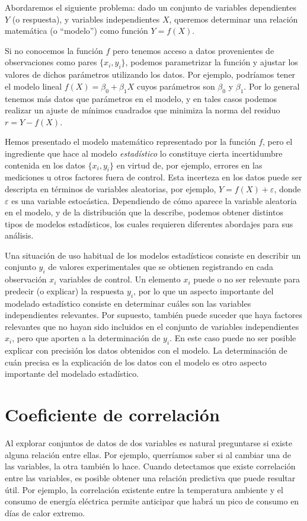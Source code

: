Abordaremos el siguiente problema: dado un conjunto de variables dependientes $Y$ (o respuesta), y variables independientes $X$, queremos determinar una relación matemática (o ``modelo'') como función $Y = f(X)$.

Si no conocemos la función $f$ pero tenemos acceso a datos provenientes de observaciones como pares $\{x_i, y_i\}$, podemos parametrizar la función y ajustar los valores de dichos parámetros utilizando los datos. Por ejemplo, podríamos tener el modelo lineal $f(X) = \beta_0 + \beta_1 X$ cuyos parámetros son $\beta_0$ y $\beta_1$. Por lo general tenemos más datos que parámetros en el modelo, y en tales casos podemos realizar un ajuste de mínimos cuadrados que minimiza la norma del residuo $r = Y - f(X)$.

Hemos presentado el modelo matemático representado por la función $f$, pero el ingrediente que hace al modelo \textit{estadístico} lo constituye cierta incertidumbre contenida en los datos $\{x_i, y_i\}$ en virtud de, por ejemplo, errores en las mediciones u otros factores fuera de control. Esta incerteza en los datos puede ser descripta en términos de variables aleatorias, por ejemplo, $Y = f(X) + \varepsilon$, donde $\varepsilon$ es una variable estocástica. Dependiendo de cómo aparece la variable aleatoria en el modelo, y de la distribución que la describe, podemos obtener distintos tipos de modelos estadísticos, los cuales requieren diferentes abordajes para sus análisis.

Una situación de uso habitual de los modelos estadísticos consiste en describir un conjunto $y_i$ de valores experimentales que se obtienen registrando en cada observación $x_i$ variables de control. Un elemento $x_i$ puede o no ser relevante para predecir (o explicar) la respuesta $y_i$, por lo que un aspecto importante del modelado estadístico consiste en determinar cuáles son las variables independientes relevantes. Por supuesto, también puede suceder que haya factores relevantes que no hayan sido incluidos en el conjunto de variables independientes $x_i$, pero que aporten a la determinación de $y_i$. En este caso puede no ser posible explicar con precisión los datos obtenidos con el modelo. La determinación de cuán precisa es la explicación de los datos con el modelo es otro aspecto importante del modelado estadístico.

\section{Coeficiente de correlación}
Al explorar conjuntos de datos de dos variables es natural preguntarse si existe alguna relación entre ellas. Por ejemplo, querríamos saber si al cambiar una de las variables, la otra también lo hace. Cuando detectamos que existe correlación entre las variables, es posible obtener una relación predictiva que puede resultar útil. Por ejemplo, la correlación existente entre la temperatura ambiente y el consumo de energía eléctrica permite anticipar que habrá un pico de consumo en días de calor extremo.

